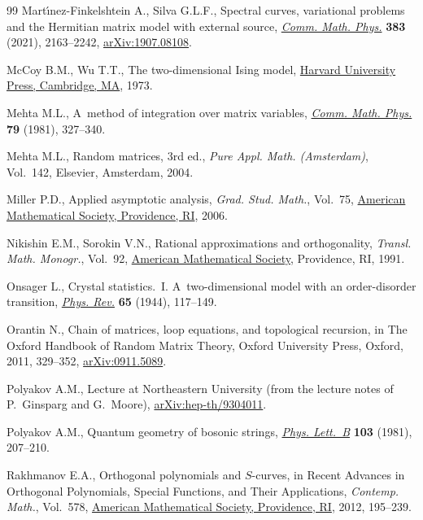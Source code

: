 \documentclass[pdftex]{sigma}
\numberwithin{equation}{section}
\begin{document}
\begin{thebibliography}{99}
Mart\'{\i}nez-Finkelshtein A., Silva G.L.F., Spectral curves, variational
 problems and the {H}ermitian matrix model with external source,
 \href{https://doi.org/10.1007/s00220-021-03999-y}{\textit{Comm. Math. Phys.}}
 \textbf{383} (2021), 2163--2242,
 \href{http://arxiv.org/abs/1907.08108}{arXiv:1907.08108}.

McCoy B.M., Wu T.T., The two-dimensional {I}sing model,
 \href{https://doi.org/10.4159/harvard.9780674180758}{Harvard University
 Press, Cambridge, MA}, 1973.

Mehta M.L., A~method of integration over matrix variables,
 \href{https://doi.org/10.1007/BF01208498}{\textit{Comm. Math. Phys.}}
 \textbf{79} (1981), 327--340.

Mehta M.L., Random matrices, 3rd ed., \textit{Pure Appl. Math. (Amsterdam)}, Vol.~142,
Elsevier, Amsterdam, 2004.

Miller P.D., Applied asymptotic analysis, \textit{Grad. Stud. Math.}, Vol.~75,
 \href{https://doi.org/10.1090/gsm/075}{American Mathematical Society,
 Providence, RI}, 2006.

Nikishin E.M., Sorokin V.N., Rational approximations and orthogonality,
 \textit{Transl. Math. Monogr.}, Vol.~92,
 \href{https://doi.org/10.1090/mmono/092}{American Mathematical Society},
 Providence, RI, 1991.

Onsager L., Crystal statistics.~{I}. {A}~two-dimensional model with an
 order-disorder transition,
 \href{https://doi.org/10.1103/PhysRev.65.117}{\textit{Phys. Rev.}}
 \textbf{65} (1944), 117--149.

Orantin N., Chain of matrices, loop equations, and topological recursion, in
 The {O}xford Handbook of Random Matrix Theory, Oxford University Press,
 Oxford, 2011, 329--352,
 \href{http://arxiv.org/abs/0911.5089}{arXiv:0911.5089}.

Polyakov A.M., Lecture at Northeastern University (from the lecture notes of
 P.~Ginsparg and G.~Moore),
 \href{http://arxiv.org/abs/hep-th/9304011}{arXiv:hep-th/9304011}.

Polyakov A.M., Quantum geometry of bosonic strings,
 \href{https://doi.org/10.1016/0370-2693(81)90743-7}{\textit{Phys. Lett.~B}}
 \textbf{103} (1981), 207--210.

Rakhmanov E.A., Orthogonal polynomials and {$S$}-curves, in Recent Advances in
 Orthogonal Polynomials, Special Functions, and Their Applications,
 \textit{Contemp. Math.}, Vol.~578,
 \href{https://doi.org/10.1090/conm/578/11484}{American Mathematical Society,
 Providence, RI}, 2012, 195--239.


\end{thebibliography}
\end{document}
